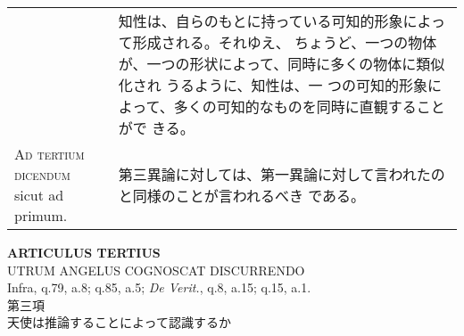 \documentclass[10pt]{jsarticle} %
\begin{document}
\begin{longtable}{p{21em}p{21em}}
&

知性は、自らのもとに持っている可知的形象によって形成される。それゆえ、
ちょうど、一つの物体が、一つの形状によって、同時に多くの物体に類似化され
 うるように、知性は、一
 つの可知的形象によって、多くの可知的なものを同時に直観することがで
 きる。


\\





{\scshape Ad tertium dicendum} sicut ad primum.


&

第三異論に対しては、第一異論に対して言われたのと同様のことが言われるべき
 である。

\end{longtable}
\newpage





\begin{center}
 {\Large {\bf ARTICULUS TERTIUS}}\\
 {\large UTRUM ANGELUS COGNOSCAT DISCURRENDO}\\
 {\footnotesize Infra, q.79, a.8; q.85, a.5; {\itshape De Verit.}, q.8,
 a.15; q.15, a.1.}\\
 {\Large 第三項\\天使は推論することによって認識するか}
\end{center}
\end{document}
